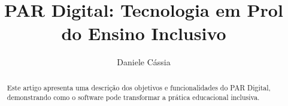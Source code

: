 \documentclass[sigconf]{webmedia}
\begin{document}
\title{PAR Digital: Tecnologia em Prol do Ensino Inclusivo}



\author{Daniele Cássia}

\vspace{1cm}



\begin{abstract}
  Este artigo apresenta uma descrição dos objetivos e funcionalidades do
  PAR Digital, demonstrando como o software pode transformar a prática
  educacional inclusiva.
\end{abstract}



\end{document}
